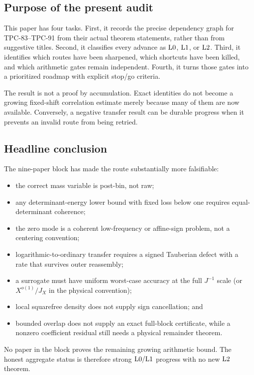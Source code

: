 \subsection{Purpose of the present audit}

This paper has four tasks.  First, it records the precise dependency
graph for TPC-83--TPC-91 from their actual theorem statements, rather
than from suggestive titles.  Second, it classifies every advance as
\(\mathrm{L0}\), \(\mathrm{L1}\), or \(\mathrm{L2}\).  Third, it identifies which
routes have been sharpened, which shortcuts have been killed, and
which arithmetic gates remain independent.  Fourth, it turns those
gates into a prioritized roadmap with explicit stop/go criteria.

The result is not a proof by accumulation.  Exact identities do not
become a growing fixed-shift correlation estimate merely because
many of them are now available.  Conversely, a negative transfer
result can be durable progress when it prevents an invalid route from
being retried.

\subsection{Headline conclusion}

The nine-paper block has made the route substantially more
falsifiable:
\begin{itemize}[leftmargin=2em]
\item the correct mass variable is post-bin, not raw;
\item any determinant-energy lower bound with fixed loss below one
  requires equal-determinant coherence;
\item the zero mode is a coherent low-frequency or affine-sign
  problem, not a centering convention;
\item logarithmic-to-ordinary transfer requires a signed Tauberian
  defect with a rate that survives outer reassembly;
\item a surrogate must have uniform worst-case accuracy at the full
  \(J^{-1}\) scale (or \(X^{o(1)}/J_X\) in the physical convention);
\item local squarefree density does not supply sign cancellation; and
\item bounded overlap does not supply an exact full-block certificate,
  while a nonzero coefficient residual still needs a physical
  remainder theorem.
\end{itemize}
No paper in the block proves the remaining growing arithmetic bound.
The honest aggregate status is therefore strong \(\mathrm{L0}/\mathrm{L1}\)
progress with no new \(\mathrm{L2}\) theorem.

